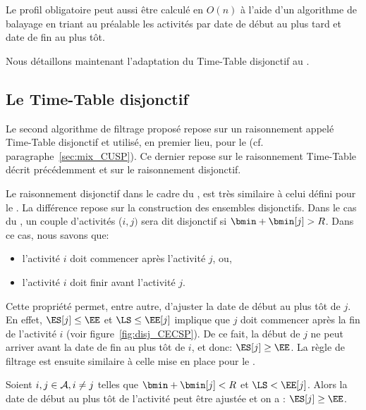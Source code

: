 Le profil obligatoire peut aussi être calculé en $O(n)$ à l'aide d'un
algorithme de balayage en triant au préalable les activités par date
de début au plus tard et date de fin au plus tôt.

Nous détaillons maintenant l'adaptation du Time-Table disjonctif au
\CECSP. 

\subsection{Le Time-Table disjonctif}

Le second algorithme de filtrage proposé repose sur un raisonnement
appelé Time-Table disjonctif et utilisé, en premier lieu, pour le
\CUSP (cf. paragraphe~\ref{sec:mix_CUSP}). Ce dernier repose sur le
raisonnement Time-Table décrit précédemment et sur le raisonnement
disjonctif.

Le raisonnement disjonctif dans le cadre du \CECSP, est très similaire
à celui défini pour le \CUSP. La différence repose sur la construction
des ensembles disjonctifs. Dans le cas du \CECSP, un couple
d'activités ($i,j)$ sera dit disjonctif si $\bmin+\bmin[j] >R$. Dans
ce cas, nous savons que:
\begin{itemize}
\item l'activité $i$ doit commencer après l'activité $j$, ou, 
\item l'activité $i$ doit finir avant l'activité $j$.  
\end{itemize}

Cette propriété permet, entre autre, d'ajuster la date de début au
plus tôt de $j$. En effet, $\ES[j] \le \EE$ et $\LS \le \EE[j]$
implique que $j$ doit commencer après la fin de l'activité $i$ (voir
figure~\ref{fig:disj_CECSP}). De ce fait, la début de $j$ ne peut arriver
avant la date de fin au plus tôt de $i$, et donc: $\ES[j] \ge \EE$. La
règle de filtrage est ensuite similaire à celle mise en place pour le
\CUSP. 

\begin{reg}
Soient $i, j \in {\cal A}, i \neq j$ telles que $\bmin+\bmin[j] < R$ et $\LS
< \EE[j]$. Alors la date de début au plus tôt de l’activité peut être
ajustée et on a : $\ES[j] \ge \EE$.
\end{reg}

